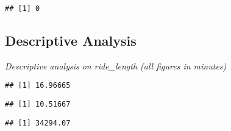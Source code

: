 \documentclass[
]{article}
\newenvironment{Shaded}{\begin{snugshade}}{\end{snugshade}}
\newcommand{\CommentTok}[1]{\textcolor[rgb]{0.56,0.35,0.01}{\textit{#1}}}
\newcommand{\FunctionTok}[1]{\textcolor[rgb]{0.00,0.00,0.00}{#1}}
\newcommand{\NormalTok}[1]{#1}
\newcommand{\SpecialCharTok}[1]{\textcolor[rgb]{0.00,0.00,0.00}{#1}}
\begin{document}
\begin{verbatim}
## [1] 0
\end{verbatim}

\hypertarget{descriptive-analysis}{%
\subsection{Descriptive Analysis}\label{descriptive-analysis}}

\emph{Descriptive analysis on ride\_length (all figures in minutes) }

\begin{Shaded}
\end{Shaded}

\begin{verbatim}
## [1] 16.96665
\end{verbatim}

\begin{Shaded}
\end{Shaded}

\begin{verbatim}
## [1] 10.51667
\end{verbatim}

\begin{Shaded}
\end{Shaded}

\begin{verbatim}
## [1] 34294.07
\end{verbatim}

\begin{Shaded}
\end{Shaded}
\end{document}
